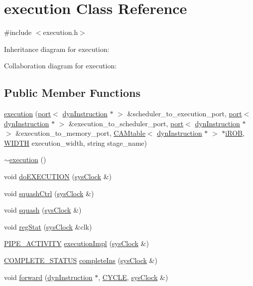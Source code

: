 \hypertarget{classexecution}{
\section{execution Class Reference}
\label{classexecution}
}


{\ttfamily \#include $<$execution.h$>$}



Inheritance diagram for execution:


Collaboration diagram for execution:
\subsection*{Public Member Functions}
\begin{DoxyCompactItemize}
\item 
\hyperlink{classexecution_a87b2844b03233ad768fa1ad67e1f93df}{execution} (\hyperlink{classport}{port}$<$ \hyperlink{classdynInstruction}{dynInstruction} $\ast$ $>$ \&scheduler\_\-to\_\-execution\_\-port, \hyperlink{classport}{port}$<$ \hyperlink{classdynInstruction}{dynInstruction} $\ast$ $>$ \&execution\_\-to\_\-scheduler\_\-port, \hyperlink{classport}{port}$<$ \hyperlink{classdynInstruction}{dynInstruction} $\ast$ $>$ \&execution\_\-to\_\-memory\_\-port, \hyperlink{classCAMtable}{CAMtable}$<$ \hyperlink{classdynInstruction}{dynInstruction} $\ast$ $>$ $\ast$\hyperlink{backend_2parser_8cpp_ad73ae25f81e6e99482f3fbd5ba9664ce}{iROB}, \hyperlink{global_2global_8h_a6fa2e24b8a418fa215e183264cbea3aa}{WIDTH} execution\_\-width, string stage\_\-name)
\item 
\hyperlink{classexecution_a686c28582542ecb0a4d41f9a649a6357}{$\sim$execution} ()
\item 
void \hyperlink{classexecution_a972207b1dde6a4bb8731c3fc0908bac6}{doEXECUTION} (\hyperlink{classsysClock}{sysClock} \&)
\item 
void \hyperlink{classexecution_a3e12895813ee78b1a7d2d10894db1204}{squashCtrl} (\hyperlink{classsysClock}{sysClock} \&)
\item 
void \hyperlink{classexecution_a243c30ebc13c7e2e6c1eb46a8fcac55e}{squash} (\hyperlink{classsysClock}{sysClock} \&)
\item 
void \hyperlink{classexecution_af6a859d27808b6db44c92b0ff79ef426}{regStat} (\hyperlink{classsysClock}{sysClock} \&clk)
\item 
\hyperlink{unit_2stage_8h_ab00e4188e8b8974fecb1dfd12764cbb1}{PIPE\_\-ACTIVITY} \hyperlink{classexecution_adc2d24703f3425df6107514535fea88b}{executionImpl} (\hyperlink{classsysClock}{sysClock} \&)
\item 
\hyperlink{unit_2stage_8h_a7de04de95175471455cf906d80af3968}{COMPLETE\_\-STATUS} \hyperlink{classexecution_a0c823fb6010268a0da3a706a9452d5e0}{completeIns} (\hyperlink{classsysClock}{sysClock} \&)
\item 
void \hyperlink{classexecution_a9271c55da8555444f0882c9027ab68a0}{forward} (\hyperlink{classdynInstruction}{dynInstruction} $\ast$, \hyperlink{global_2global_8h_a7e19a550ec11d1ed921deb20c22efb5b}{CYCLE}, \hyperlink{classsysClock}{sysClock} \&)
\end{DoxyCompactItemize}


